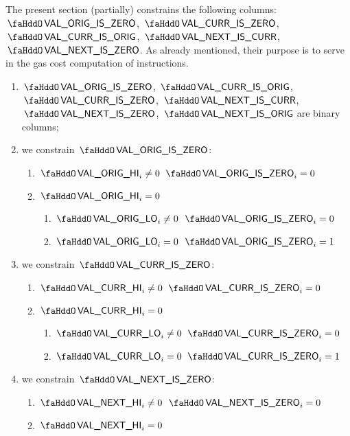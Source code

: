 \begin{center}
\end{center}

The present section (partially) constrains the following columns:
$\stoOrigValueIsZero$,
$\stoCurrValueIsZero$, 
$\stoCurrValueIsOrig$, 
$\stoNextValueIsCurr$,
$\stoNextValueIsZero$. As already mentioned, their purpose is to serve in the gas cost computation of  instructions.
\begin{enumerate}
	\item 
	$\stoOrigValueIsZero$,
	$\stoCurrValueIsOrig$,
	$\stoCurrValueIsZero$,
	$\stoNextValueIsCurr$,
	$\stoNextValueIsZero$,
	$\stoNextValueIsOrig$
	are binary columns;
	\item we constrain $\stoOrigValueIsZero$:
	\begin{enumerate}
		\item \If $\stoOrigValueHi_{i} \neq 0$ \Then $\stoOrigValueIsZero_{i} = 0$
		\item \If $\stoOrigValueHi_{i} = 0$ \Then
		\begin{enumerate}
			\item \If $\stoOrigValueLo_{i} \neq	0$ \Then $\stoOrigValueIsZero_{i} = 0$
			\item \If $\stoOrigValueLo_{i}	=	0$ \Then $\stoOrigValueIsZero_{i} = 1$
		\end{enumerate}
	\end{enumerate}
	\item we constrain $\stoCurrValueIsZero$:
	\begin{enumerate}
		\item \If $\stoCurrValueHi_{i} \neq 0$ \Then $\stoCurrValueIsZero_{i} = 0$
		\item \If $\stoCurrValueHi_{i} = 0$ \Then
		\begin{enumerate}
			\item \If $\stoCurrValueLo_{i} \neq	0$ \Then $\stoCurrValueIsZero_{i} = 0$
			\item \If $\stoCurrValueLo_{i}	=	0$ \Then $\stoCurrValueIsZero_{i} = 1$
		\end{enumerate}
	\end{enumerate}
	\item we constrain $\stoNextValueIsZero$:
	\begin{enumerate}
		\item \If $\stoNextValueHi_{i} \neq 0$ \Then $\stoNextValueIsZero_{i} = 0$
		\item \If $\stoNextValueHi_{i} = 0$ \Then

\end{enumerate}
\end{enumerate}
